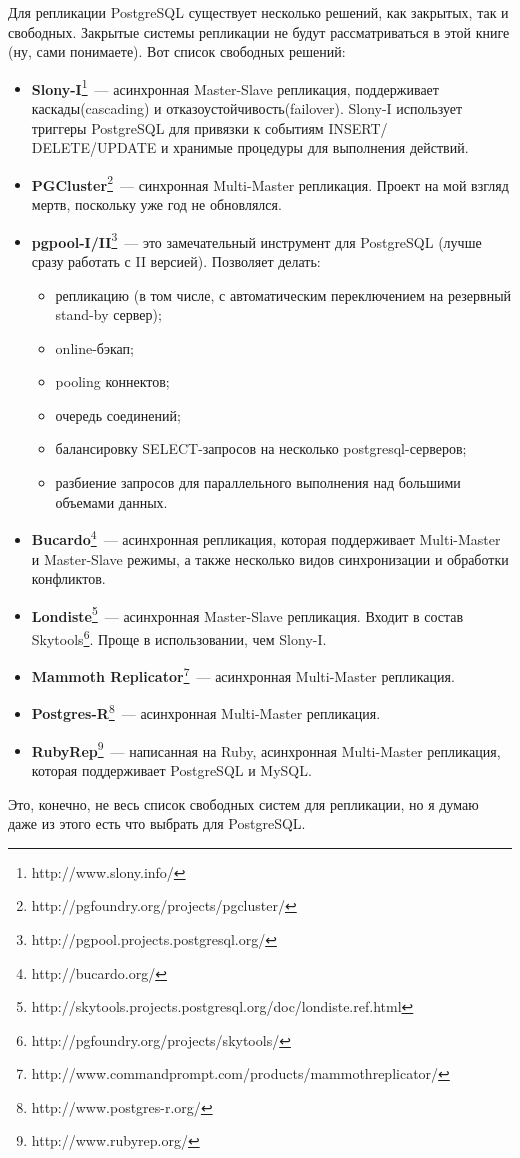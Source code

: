 Для репликации PostgreSQL существует несколько решений, как закрытых, так и свободных. 
Закрытые системы репликации не будут рассматриваться в этой книге (ну, сами понимаете). Вот список свободных решений:
\begin{itemize}
\item \textbf{Slony-I}\footnote{http://www.slony.info/}~--- асинхронная Master-Slave репликация, 
поддерживает каскады(cascading) и отказоустойчивость(failover). 
Slony-I использует триггеры PostgreSQL для привязки к событиям INSERT/ DELETE/UPDATE и хранимые 
процедуры для выполнения действий. 

\item \textbf{PGCluster}\footnote{http://pgfoundry.org/projects/pgcluster/}~--- синхронная Multi-Master репликация. 
Проект на мой взгляд мертв, поскольку уже год не обновлялся.

\item \textbf{pgpool-I/II}\footnote{http://pgpool.projects.postgresql.org/}~--- это замечательный инструмент для 
PostgreSQL (лучше сразу работать с II версией). Позволяет делать:
\begin{itemize}
\item репликацию (в том числе, с автоматическим переключением на резервный stand-by сервер);
\item online-бэкап;
\item pooling коннектов;
\item очередь соединений;
\item балансировку SELECT-запросов на несколько postgresql-серверов;
\item разбиение запросов для параллельного выполнения над большими объемами данных.
\end{itemize}

\item \textbf{Bucardo}\footnote{http://bucardo.org/}~--- асинхронная репликация, которая поддерживает Multi-Master и Master-Slave режимы, 
а также несколько видов синхронизации и обработки конфликтов. 

\item \textbf{Londiste}\footnote{http://skytools.projects.postgresql.org/doc/londiste.ref.html}~--- асинхронная Master-Slave 
репликация. Входит в состав Skytools\footnote{http://pgfoundry.org/projects/skytools/}. Проще в использовании, чем Slony-I.

\item \textbf{Mammoth Replicator}\footnote{http://www.commandprompt.com/products/mammothreplicator/}~--- асинхронная 
Multi-Master репликация. 

\item \textbf{Postgres-R}\footnote{http://www.postgres-r.org/}~--- асинхронная Multi-Master репликация.

\item \textbf{RubyRep}\footnote{http://www.rubyrep.org/}~--- написанная на Ruby, асинхронная Multi-Master 
репликация, которая поддерживает PostgreSQL и MySQL.
\end{itemize}

Это, конечно, не весь список свободных систем для репликации, но я думаю даже из этого есть что выбрать для PostgreSQL.